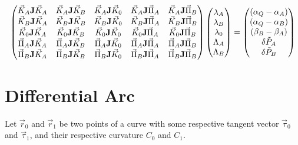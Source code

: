 \documentclass[11pt]{amsart}
\newcommand{\mymat}[1]{\mathbf{#1}}
\begin{document}
\[
	\begin{pmatrix}
		\vec{K}_A\mymat{J}\vec{K}_A&\vec{K}_A\mymat{J}\vec{K}_B&\vec{K}_A\mymat{J}\vec{K}_0&\vec{K}_A\mymat{J}\vec{\Pi}_A&\vec{K}_A\mymat{J}\vec{\Pi}_B\cr
		\vec{K}_B\mymat{J}\vec{K}_A&\vec{K}_B\mymat{J}\vec{K}_B&\vec{K}_B\mymat{J}\vec{K}_0&\vec{K}_B\mymat{J}\vec{\Pi}_A&\vec{K}_B\mymat{J}\vec{\Pi}_B\cr
		\vec{K}_0\mymat{J}\vec{K}_A&\vec{K}_0\mymat{J}\vec{K}_B&\vec{K}_0\mymat{J}\vec{K}_0&\vec{K}_0\mymat{J}\vec{\Pi}_A&\vec{K}_0\mymat{J}\vec{\Pi}_B\cr
		\vec{\Pi}_A\mymat{J}\vec{K}_A&\vec{\Pi}_A\mymat{J}\vec{K}_B&\vec{\Pi}_A\mymat{J}\vec{K}_0&\vec{\Pi}_A\mymat{J}\vec{\Pi}_A&\vec{\Pi}_A\mymat{J}\vec{\Pi}_B\cr
		\vec{\Pi}_B\mymat{J}\vec{K}_A&\vec{\Pi}_B\mymat{J}\vec{K}_B&\vec{\Pi}_B\mymat{J}\vec{K}_0&\vec{\Pi}_B\mymat{J}\vec{\Pi}_A&\vec{\Pi}_B\mymat{J}\vec{\Pi}_B\cr
	\end{pmatrix}
	\begin{pmatrix}
	\lambda_A\cr
	\lambda_B\cr
	\lambda_0\cr
	\Lambda_A\cr
	\Lambda_B\cr
	\end{pmatrix}
	=
	\begin{pmatrix}
		(\alpha_Q-\alpha_A)\cr
		(\alpha_Q-\alpha_B)\cr
	 	(\beta_B-\beta_A)\cr
	 	\delta\tilde{P}_A\cr
	 	\delta\tilde{P}_B\cr
	\end{pmatrix}
\]
\section{Differential Arc}
Let $\vec{r}_0$ and $\vec{r}_1$ be two points of a curve
with some respective tangent vector $\vec{\tau}_0$ and $\vec{\tau}_1$, and their
respective curvature $C_0$ and $C_1$.
\end{document}

